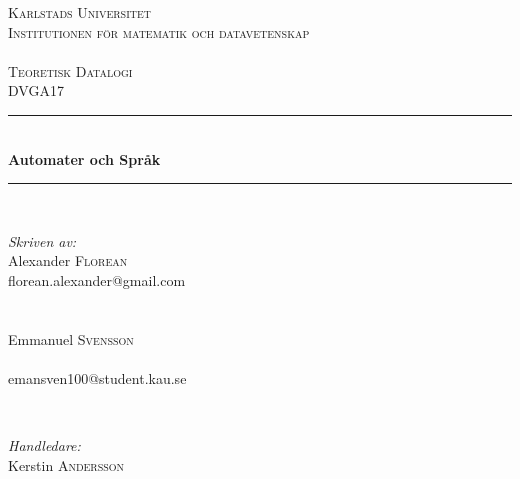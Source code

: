 \begin{titlepage}

\newcommand{\HRule}{\rule{\linewidth}{0.5mm}} %

\center %
 

 \textsc{\LARGE{Karlstads Universitet}\\ \small Institutionen för matematik och datavetenskap}\\
 \textsc{\Large \\Teoretisk Datalogi \\ \small DVGA17}\\ %



 \HRule \\[0.3cm]
 { \huge \bfseries Automater och Språk}\\[0.3cm] %
 \HRule \\[1.5cm]
  

  \begin{minipage}{0.4\textwidth}
  \begin{flushleft} \large
  \emph{Skriven av:}\\
  Alexander \textsc{Florean}\\
  florean.alexander@gmail.com\\ \\ \\
  Emmanuel \textsc{Svensson}\\
   \\
  
  emansven100@student.kau.se
  \end{flushleft}
  \end{minipage}
  ~
  \begin{minipage}{0.4\textwidth}
  \begin{flushright} \large
  \emph{Handledare:}\\
  Kerstin \textsc{Andersson}
  

\end{flushright}
\end{minipage}
\end{titlepage}
